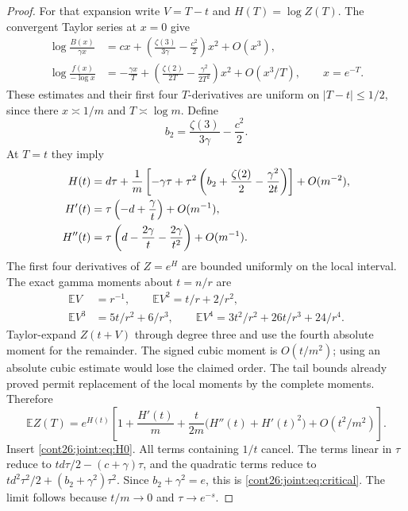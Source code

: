 \begin{proof}
For that expansion write $V=T-t$ and $H(T)=\log Z(T)$.
The convergent Taylor series at $x=0$ give
\begin{align*}
 \log\frac{B(x)}{\gamma x}
 &=cx+\left(\frac{\zeta(3)}{3\gamma}-\frac{c^2}{2}\right)x^2
   +O(x^3),\\
 \log\frac{f(x)}{-\log x}
 &=-\frac{\gamma x}{T}
 +\left(\frac{\zeta(2)}{2T}-\frac{\gamma^2}{2T^2}\right)x^2
 +O(x^3/T),\qquad x=e^{-T}.
\end{align*}
These estimates and their first four $T$-derivatives are uniform
on $|T-t|\le1/2$, since there $x\asymp1/m$ and $T\asymp\log m$.
Define
\[
 b_2=\frac{\zeta(3)}{3\gamma}-\frac{c^2}{2}.
\]
At $T=t$ they imply
\begin{align}
 H(t)&=d\tau+\frac1m\left[
 -\gamma\tau+\tau^2\left(b_2+\frac{\zeta(2)}2
                         -\frac{\gamma^2}{2t}\right)\right]
 +O(m^{-2}),\label{cont26:joint:eq:H0}\\
 H'(t)&=\tau\left(-d+\frac\gamma t\right)+O(m^{-1}),\notag\\
 H''(t)&=\tau\left(d-\frac{2\gamma}t-
                           \frac{2\gamma}{t^2}\right)+O(m^{-1}).\notag
\end{align}
The first four derivatives of $Z=e^H$ are bounded uniformly on the
local interval.  The exact gamma moments about $t=n/r$ are
\begin{align*}
 \mathbb EV&=r^{-1},\qquad
 \mathbb EV^2=t/r+2/r^2,\\
 \mathbb EV^3&=5t/r^2+6/r^3,\qquad
 \mathbb EV^4=3t^2/r^2+26t/r^3+24/r^4.
\end{align*}
Taylor-expand $Z(t+V)$ through degree three and use the fourth
absolute moment for the remainder.  The signed cubic moment is
$O(t/m^2)$; using an absolute cubic estimate would lose the claimed
order.  The tail bounds already proved permit replacement of
the local moments by the complete moments.  Therefore
\begin{equation}\label{cont26:joint:eq:expect-expansion}
 \mathbb E Z(T)=e^{H(t)}
 \left[1+\frac{H'(t)}m+
 \frac{t}{2m}\bigl(H''(t)+H'(t)^2\bigr)
 +O(t^2/m^2)\right].
\end{equation}
Insert \eqref{cont26:joint:eq:H0}.  All terms containing $1/t$ cancel.
The terms linear in $\tau$ reduce to
$td\tau/2-(c+\gamma)\tau$, and the quadratic terms reduce to
$td^2\tau^2/2+(b_2+\gamma^2)\tau^2$.
Since $b_2+\gamma^2=e$, this is \eqref{cont26:joint:eq:critical}.
The limit follows because $t/m\to0$ and $\tau\to e^{-s}$.
\end{proof}


